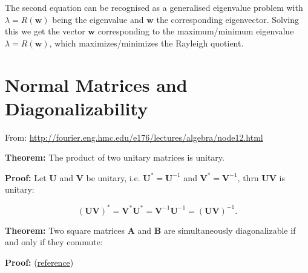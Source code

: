 \documentclass[10pt,b5paper,titlepage]{book}
\begin{document}
The second equation can be recognised as a generalised eigenvalue problem with
$\lambda = R(\mathbf{w})$ being the eigenvalue and $\mathbf{w}$ the corresponding
eigenvector. Solving this we get the vector $\mathbf{w}$ corresponding to the
maximum/minimum eigenvalue $\lambda = R(\mathbf{w})$, which maximizes/minimizes
the Rayleigh quotient.


\chapter{Normal Matrices and Diagonalizability}

From: \url{http://fourier.eng.hmc.edu/e176/lectures/algebra/node12.html}

\textbf{Theorem:} The product of two unitary matrices is unitary.

\textbf{Proof:} Let $\mathbf{U}$ and $\mathbf{V}$ be unitary, i.e.
$\mathbf{U}^{*} = \mathbf{U}^{-1}$ and $\mathbf{V}^{*} = \mathbf{V}^{-1}$,
thrn $\mathbf{U}\mathbf{V}$ is unitary:

\begin{equation}
    (\mathbf{U}\mathbf{V})^{*} = \mathbf{V}^{*}\mathbf{U}^{*}
    = \mathbf{V}^{-1}\mathbf{U}^{-1} = (\mathbf{U}\mathbf{V})^{-1}
.\end{equation}


\textbf{Theorem:} Two square matrices $\mathbf{A}$ and $\mathbf{B}$ are simultaneously
diagonalizable if and only if they commute:

\textbf{Proof:} (\href{http://math.stackexchange.com/questions/236212/simultaneously-diagonalizable-proof}{reference})
\end{document}
